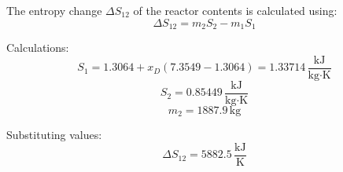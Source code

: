 The entropy change \( \Delta S_{12} \) of the reactor contents is calculated using:  
\[
\Delta S_{12} = m_2 S_2 - m_1 S_1
\]  

Calculations:  
\[
S_1 = 1.3064 + x_D (7.3549 - 1.3064) = 1.33714 \, \frac{\text{kJ}}{\text{kg·K}}
\]  
\[
S_2 = 0.85449 \, \frac{\text{kJ}}{\text{kg·K}}
\]  
\[
m_2 = 1887.9 \, \text{kg}
\]  

Substituting values:  
\[
\Delta S_{12} = 5882.5 \, \frac{\text{kJ}}{\text{K}}
\]
